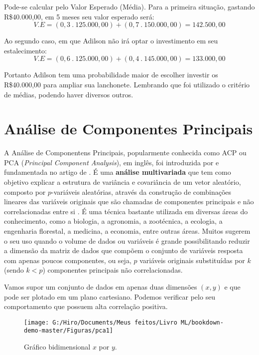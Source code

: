 \documentclass[
  openany]{book}
\begin{document}
Pode-se calcular pelo Valor Esperado (Média). Para a primeira situação, gastando R\$40.000,00, em 5 meses seu valor esperado será:
\[V.E=(0,3\ .\ 125.000,00)+(0,7\ . \ 150.000,00)= 142.500,00\]

Ao segundo caso, em que Adilson não irá optar o investimento em seu estalecimento:
\[V.E=(0,6\ .\ 125.000,00)+(0,4\ . \ 145.000,00)= 133.000,00\]

Portanto Adilson tem uma probabilidade maior de escolher investir os R\$40.000,00 para ampliar sua lanchonete. Lembrando que foi utilizado o critério de médias, podendo haver diversos outros.

\hypertarget{AC}{%
\section{Análise de Componentes Principais}\label{AC}}

A Análise de Componentens Principais, popularmente conhecida como ACP ou PCA (\emph{Principal Component Analysis}), em inglês, foi introduzida por \citet{pearson1901liii} e fundamentada no artigo de \citet{hotelling1933analysis}. É uma \textbf{análise multivariada} que tem como objetivo explicar a estrutura de variância e covariância de um vetor aleatório, composto por \(p\)-variáveis aleatórias, através da construção de combinações lineares das variáveis originais que são chamadas de componentes principais e não correlacionadas entre si \citep{mingoti2007analise}. É uma técnica bastante utilizada em diversas áreas do conhecimento, como a biologia, a agronomia, a zootécnica, a ecologia, a engenharia florestal, a medicina, a economia, entre outras áreas. Muitos sugerem o seu uso quando o volume de dados ou variáveis é grande possibilitando reduzir a dimensão da matriz de dados que compõem o conjunto de variáveis resposta com apenas poucos componentes, ou seja, \(p\) variáveis originais substituídas por \(k\) (sendo \(k < p\)) componentes principais não correlacionadas.

Vamos supor um conjunto de dados em apenas duas dimensões \((x, y)\) e que pode ser plotado em um plano cartesiano. Podemos verificar pelo seu comportamento que possuem alta correlação positiva.

\begin{figure}

{\centering \texttt{[image: G:/Hiro/Documents/Meus feitos/Livro ML/bookdown-demo-master/Figuras/pca1]} 

}

\caption{Gráfico bidimensional \(x\) por \(y\).}\label{fig:pca1}
\end{figure}
\end{document}
